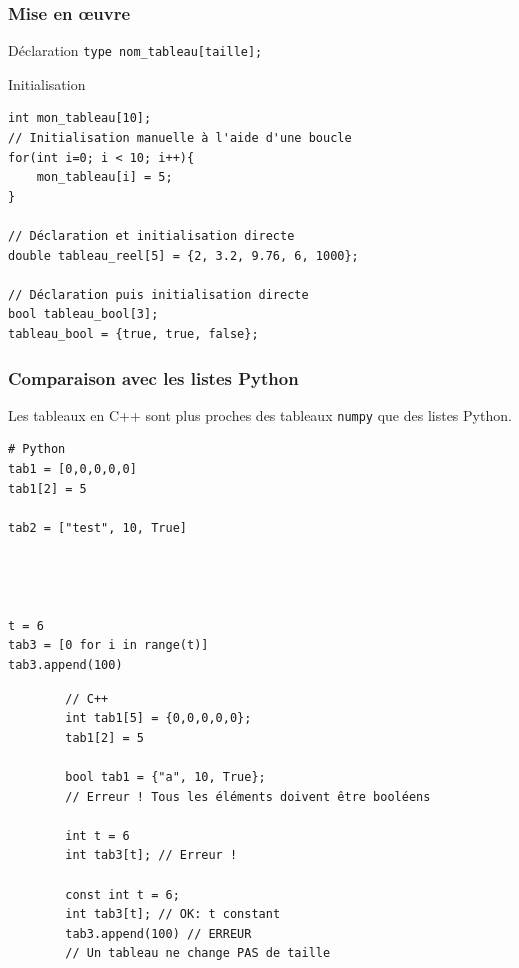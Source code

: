 \begin{frame}[fragile=singleslide]
	\frametitle{{Mise en \oe{}uvre}}
	\begin{exampleblock}{Déclaration}
		\centering
		\texttt{type nom_tableau[taille];}
	\end{exampleblock}
	
	\begin{exampleblock}{Initialisation}
    \begin{verbatim}
int mon_tableau[10];
// Initialisation manuelle à l'aide d'une boucle
for(int i=0; i < 10; i++){
    mon_tableau[i] = 5;
}

// Déclaration et initialisation directe
double tableau_reel[5] = {2, 3.2, 9.76, 6, 1000};

// Déclaration puis initialisation directe
bool tableau_bool[3];
tableau_bool = {true, true, false};
    \end{verbatim}
	\end{exampleblock}
\end{frame}

\begin{frame}[fragile]
 	\frametitle{Comparaison avec les listes Python}
    Les tableaux en C++ sont plus proches des tableaux \texttt{numpy} que des listes Python.
    
	\begin{minipage}{0.49\linewidth}
		\begin{verbatim}
# Python
tab1 = [0,0,0,0,0]
tab1[2] = 5

tab2 = ["test", 10, True]




t = 6
tab3 = [0 for i in range(t)]
tab3.append(100)
		\end{verbatim}
 	\end{minipage}
 	\begin{minipage}{0.50\linewidth}
 		\begin{verbatim}
        // C++
        int tab1[5] = {0,0,0,0,0};
        tab1[2] = 5

        bool tab1 = {"a", 10, True};
        // Erreur ! Tous les éléments doivent être booléens

        int t = 6
        int tab3[t]; // Erreur !

        const int t = 6;
        int tab3[t]; // OK: t constant
        tab3.append(100) // ERREUR
        // Un tableau ne change PAS de taille
 		\end{verbatim}
 	\end{minipage}
\end{frame}

